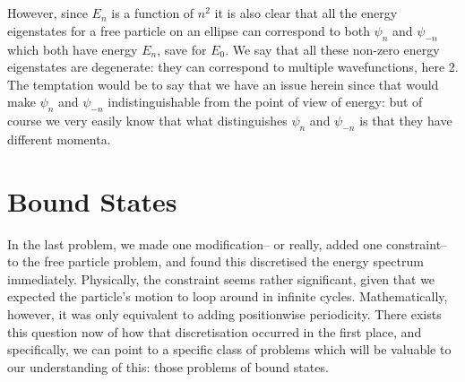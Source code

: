 \\\\
However, since $E_n$ is a function of $n^2$ it is also clear that all the energy eigenstates for a free particle on an ellipse can correspond to both $\psi_n$ and $\psi_{-n}$ which both have energy $E_n$, save for $E_0$. We say that all these non-zero energy eigenstates are degenerate: they can correspond to multiple wavefunctions, here 2. The temptation would be to say that we have an issue herein since that would make $\psi_n$ and $\psi_{-n}$ indistinguishable from the point of view of energy: but of course we very easily know that what distinguishes $\psi_n$ and $\psi_{-n}$ is that they have different momenta.
\section{Bound States}
In the last problem, we made one modification-- or really, added one constraint-- to the free particle problem, and found this discretised the energy spectrum immediately. Physically, the constraint seems rather significant, given that we expected the particle's motion to loop around in infinite cycles. Mathematically, however, it was only equivalent to adding positionwise periodicity. There exists this question now of how that discretisation occurred in the first place, and specifically, we can point to a specific class of problems which will be valuable to our understanding of this: those problems of bound states.
